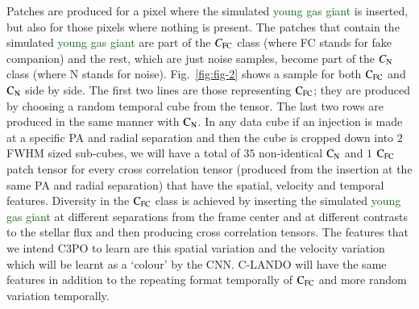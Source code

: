 \documentclass{aa}
\newcommand{\newchange}[1]{\textcolor{darkgreen}{#1}}
\begin{document}
Patches are produced for a pixel where the simulated \newchange{young gas giant} is inserted, but also for those pixels where nothing is present.
The patches that contain the simulated \newchange{young gas giant} are part of the $C_{\rm{FC}}$ class (where FC stands for fake companion) and the rest, which are just noise samples, become part of the $C_{\rm{N}}$ class (where N stands for noise).
Fig.~\ref{fig:fig-2} shows a sample for both $\rm{C_{FC}}$ and $\rm{C_N}$ side by side.
The first two lines are those representing $\rm{C_{FC}}$; they are produced by choosing a random temporal cube from the tensor.
The last two rows are produced in the same manner with $\rm{C_N}$.
In any data cube if an injection is made at a specific PA and radial separation and then the cube is cropped down into $2$ FWHM sized sub-cubes, we will have a total of $35$ non-identical $\rm{C_N}$ and $1$ $\rm{C_{FC}}$ patch tensor for every cross correlation tensor (produced from the insertion at the same PA and radial separation) that have the spatial, velocity and temporal features. 
Diversity in the $\rm{C_{FC}}$ class is achieved by inserting the simulated \newchange{young gas giant} at different separations from the frame center and at different contrasts to the stellar flux and then producing cross correlation tensors.
The features that we intend C3PO to learn are this spatial variation and the velocity variation which will be learnt as a ‘colour’ by the CNN. 
C-LANDO will have the same features in addition to the repeating format temporally of $\rm{C_{FC}}$ and more random variation temporally.
\end{document}
